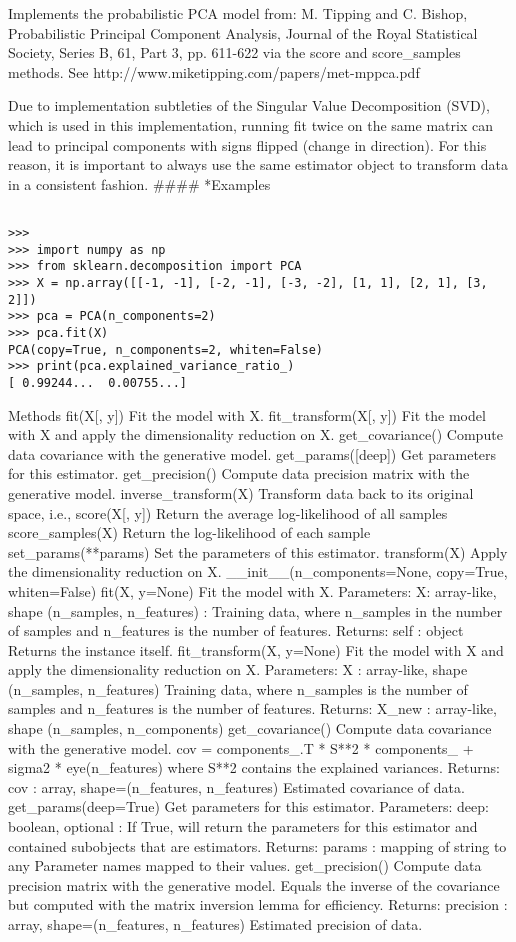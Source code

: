 Implements the probabilistic PCA model from: M. Tipping and C. Bishop, Probabilistic Principal Component Analysis, Journal of the Royal Statistical Society, Series B, 61, Part 3, pp. 611-622 via the score and score_samples methods. See http://www.miketipping.com/papers/met-mppca.pdf

Due to implementation subtleties of the Singular Value Decomposition (SVD), which is used in this implementation, running fit twice on the same matrix can lead to principal components with signs flipped (change in direction). For this reason, it is important to always use the same estimator object to transform data in a consistent fashion.
#### *{Examples}
\begin{framed}
\begin{verbatim}

>>>
>>> import numpy as np
>>> from sklearn.decomposition import PCA
>>> X = np.array([[-1, -1], [-2, -1], [-3, -2], [1, 1], [2, 1], [3, 2]])
>>> pca = PCA(n_components=2)
>>> pca.fit(X)
PCA(copy=True, n_components=2, whiten=False)
>>> print(pca.explained_variance_ratio_) 
[ 0.99244...  0.00755...]
\end{verbatim}
\end{framed}
Methods
fit(X[, y]) Fit the model with X.
fit_transform(X[, y]) Fit the model with X and apply the dimensionality reduction on X.
get_covariance() Compute data covariance with the generative model.
get_params([deep]) Get parameters for this estimator.
get_precision() Compute data precision matrix with the generative model.
inverse_transform(X) Transform data back to its original space, i.e.,
score(X[, y]) Return the average log-likelihood of all samples
score_samples(X) Return the log-likelihood of each sample
set_params(**params) Set the parameters of this estimator.
transform(X) Apply the dimensionality reduction on X.
__init__(n_components=None, copy=True, whiten=False)
fit(X, y=None)
Fit the model with X.
Parameters: 
X: array-like, shape (n_samples, n_features) :
Training data, where n_samples in the number of samples and n_features is the number of features.
Returns: 
self : object
Returns the instance itself.
fit_transform(X, y=None)
Fit the model with X and apply the dimensionality reduction on X.
Parameters: 
X : array-like, shape (n_samples, n_features)
Training data, where n_samples is the number of samples and n_features is the number of features.
Returns: 
X_new : array-like, shape (n_samples, n_components)
get_covariance()
Compute data covariance with the generative model.
cov = components_.T * S**2 * components_ + sigma2 * eye(n_features) where S**2 contains the explained variances.
Returns: 
cov : array, shape=(n_features, n_features)
Estimated covariance of data.
get_params(deep=True)
Get parameters for this estimator.
Parameters: 
deep: boolean, optional :
If True, will return the parameters for this estimator and contained subobjects that are estimators.
Returns: 
params : mapping of string to any
Parameter names mapped to their values.
get_precision()
Compute data precision matrix with the generative model.
Equals the inverse of the covariance but computed with the matrix inversion lemma for efficiency.
Returns: 
precision : array, shape=(n_features, n_features)
Estimated precision of data.
